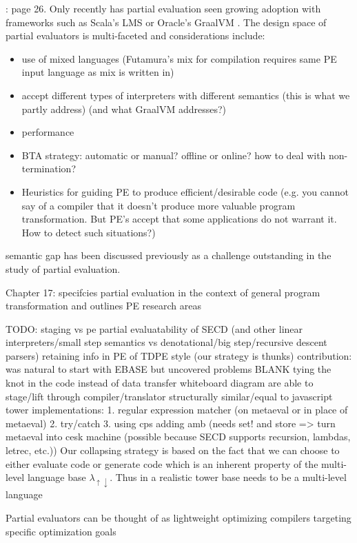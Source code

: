 \documentclass[fleqn]{article}
\theoremstyle{definition}
\newcommand{\mslang}{$\lambda_{\uparrow\downarrow}$}
\begin{document}
\cite{jones1993partial}: page 26. Only recently has partial evaluation seen growing adoption with frameworks such as Scala's LMS \cite{rompf2010lightweight} or Oracle's GraalVM \cite{wurthinger2013one}. The design space of partial evaluators is multi-faceted and considerations include:
\begin{itemize}
	\item use of mixed languages (Futamura's mix for compilation requires same PE input language as mix is written in)
	\item accept different types of interpreters with different semantics (this is what we partly address) (and what GraalVM addresses?)
	\item performance
	\item BTA strategy: automatic or manual? offline or online? how to deal with non-termination?
	\item Heuristics for guiding PE to produce efficient/desirable code (e.g. you cannot say of a compiler that it doesn't produce more valuable program transformation. But PE's accept that some applications do not warrant it. How to detect such situations?)
\end{itemize}

semantic gap has been discussed previously as a challenge outstanding in the study of partial evaluation.

Chapter 17: specifcies partial evaluation in the context of general program transformation and outlines PE research areas

TODO:
staging vs pe
partial evaluatability of SECD (and other linear interpreters/small step semantics vs denotational/big step/recursive descent parsers)
retaining info in PE of TDPE style (our strategy is thunks)
contribution: was natural to start with EBASE but uncovered problems BLANK
tying the knot in the code instead of data
transfer whiteboard diagram
are able to stage/lift through compiler/translator
structurally similar/equal to javascript tower
implementations:
	1. regular expression matcher (on metaeval or in place of metaeval)
	2. try/catch
	3. using cps adding amb (needs set! and store => turn metaeval into cesk machine (possible because SECD supports recursion, lambdas, letrec, etc.))
Our collapsing strategy is based on the fact that we can choose to either evaluate code or generate code which is an inherent property of the multi-level language base \mslang. Thus in a realistic tower base needs to be a multi-level language

Partial evaluators can be thought of as lightweight optimizing compilers targeting specific optimization goals
\end{document}

